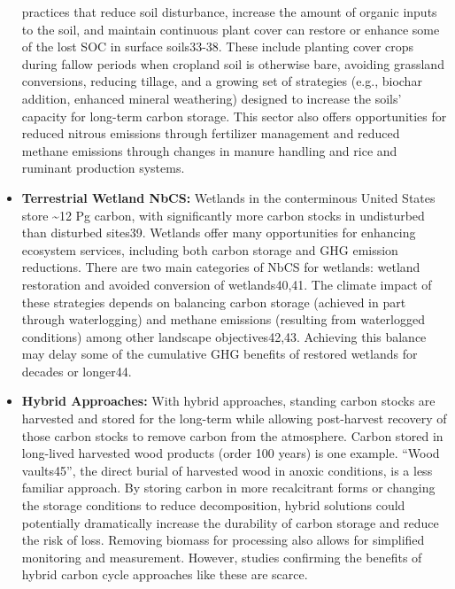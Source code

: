 \documentclass[
  letterpaper,
  DIV=11,
  numbers=noendperiod]{scrreprt}
\begin{document}
\begin{itemize}
  practices that reduce soil disturbance, increase the amount of organic
  inputs to the soil, and maintain continuous plant cover can restore or
  enhance some of the lost SOC in surface soils33-38. These include
  planting cover crops during fallow periods when cropland soil is
  otherwise bare, avoiding grassland conversions, reducing tillage, and
  a growing set of strategies (e.g., biochar addition, enhanced mineral
  weathering) designed to increase the soils' capacity for long-term
  carbon storage. This sector also offers opportunities for reduced
  nitrous emissions through fertilizer management and reduced methane
  emissions through changes in manure handling and rice and ruminant
  production systems.
\item
  \textbf{Terrestrial Wetland NbCS:} Wetlands in the conterminous United
  States store \textasciitilde12 Pg carbon, with significantly more
  carbon stocks in undisturbed than disturbed sites39. Wetlands offer
  many opportunities for enhancing ecosystem services, including both
  carbon storage and GHG emission reductions. There are two main
  categories of NbCS for wetlands: wetland restoration and avoided
  conversion of wetlands40,41. The climate impact of these strategies
  depends on balancing carbon storage (achieved in part through
  waterlogging) and methane emissions (resulting from waterlogged
  conditions) among other landscape objectives42,43. Achieving this
  balance may delay some of the cumulative GHG benefits of restored
  wetlands for decades or longer44.
\item
  \textbf{Hybrid Approaches:} With hybrid approaches, standing carbon
  stocks are harvested and stored for the long-term while allowing
  post-harvest recovery of those carbon stocks to remove carbon from the
  atmosphere. Carbon stored in long-lived harvested wood products (order
  100 years) is one example. ``Wood vaults45'', the direct burial of
  harvested wood in anoxic conditions, is a less familiar approach. By
  storing carbon in more recalcitrant forms or changing the storage
  conditions to reduce decomposition, hybrid solutions could potentially
  dramatically increase the durability of carbon storage and reduce the
  risk of loss. Removing biomass for processing also allows for
  simplified monitoring and measurement. However, studies confirming the
  benefits of hybrid carbon cycle approaches like these are scarce.
\end{itemize}
\end{document}
